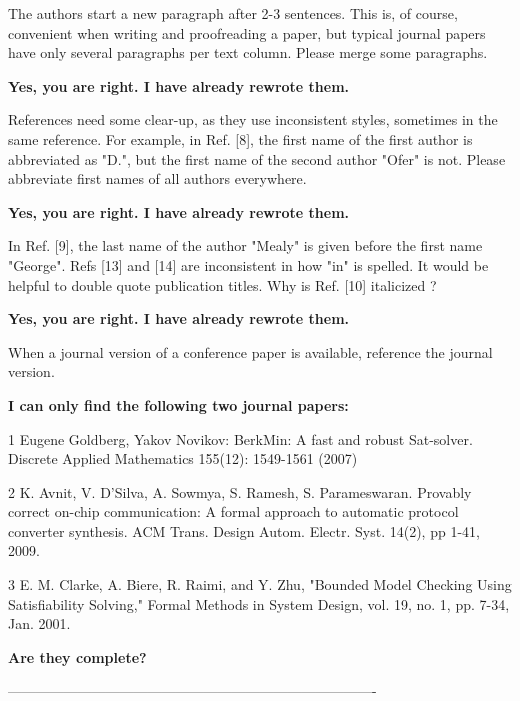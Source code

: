 \documentclass[journal]{IEEEtran}
\begin{document}
The authors start a new paragraph after 2-3 sentences. This is, of course, convenient when writing and proofreading a paper,
but typical journal papers have only several paragraphs per text column. Please merge some paragraphs.

\smallskip

\textbf{Yes,
you are right.
I have already rewrote them.}

\bigskip

References need some clear-up, as they use inconsistent styles, sometimes in the same reference. For example, in Ref. [8],
the first name of the first author is abbreviated as "D.", but the first name of the second author "Ofer" is not.
Please abbreviate first names of all authors everywhere.

\smallskip

\textbf{Yes,
you are right.
I have already rewrote them.}

\bigskip

In Ref. [9], the last name of the author "Mealy" is given before the first name "George".
Refs [13] and [14] are inconsistent in how "in" is spelled.
It would be helpful to double quote publication titles.
Why is Ref. [10] italicized ?

\smallskip

\textbf{Yes,
you are right.
I have already rewrote them.}

\bigskip

When a journal version of a conference paper is available,
reference the journal version.

\smallskip

\textbf{I can only find the following two journal papers:}

1 Eugene Goldberg, Yakov Novikov: BerkMin: A fast and robust Sat-solver. Discrete Applied Mathematics 155(12): 1549-1561 (2007)


2 K. Avnit, V. D'Silva, A. Sowmya, S. Ramesh, S. Parameswaran.
Provably correct on-chip communication: A formal approach to automatic protocol converter synthesis.
ACM Trans. Design Autom. Electr. Syst. 14(2),
pp 1-41,
2009.

3 E. M. Clarke, A. Biere, R. Raimi, and Y. Zhu,
"Bounded Model Checking Using Satisfiability Solving,"
Formal Methods in System Design,
vol. 19, no. 1,
pp. 7-34, Jan. 2001.

\textbf{Are they complete?}

\bigskip

-------------------------------------------------------------------------------
\end{document}
